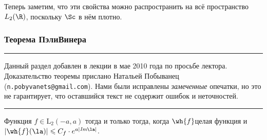 \documentclass[a4paper]{article}
\newenvironment{petit}
{\par \smallskip \hrule \smallskip \footnotesize}
{\par \smallskip \hrule \smallskip}
\begin{document}
Теперь заметим, что эти свойства можно распространить на всё пространство $L_2(\R)$,
поскольку $\Sc$ в нём плотно.

\subsubsection{Теорема Пэли\ч Винера}

\begin{petit}
Данный раздел добавлен в лекции в мае 2010 года по просьбе лектора. Доказательство теоремы
прислано Натальей Побыванец (\texttt{n.pobyvanets@gmail.com}). Нами были исправлены \emph{замеченные}
опечатки, но это не гарантирует, что оставшийся текст не содержит ошибок и неточностей.
\end{petit}

\begin{theorem}
Функция $f \in \mbox{L}_2(-a,a)$ тогда и только тогда, когда
$\wh{f}$\т целая функция и $|\wh{f}(\la)| \leqslant C_f \cdot e^{a|\emph{Im}\la|}$.
\end{theorem}
\end{document}
